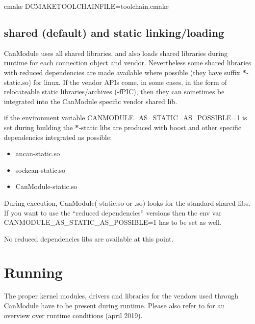 \documentclass[letterpaper,10pt,english]{sphinxmanual}
\begin{document}
\begin{sphinxVerbatim}[commandchars=\\\{\}]
cmake \PYGZhy{}DCMAKE\PYGZus{}TOOLCHAIN\PYGZus{}FILE=toolchain.cmake
\end{sphinxVerbatim}


\section{shared (default) and static linking/loading}
\label{\detokenize{building:shared-default-and-static-linking-loading}}
CanModule uses all shared libraries, and also loads shared libraries during runtime for each connection
object and vendor. Nevertheless some shared libraries with reduced dependencies are made available
where possible (they have suffix {\color{red}\bfseries{}*}-static.so) for linux.
If the vendor APIs come, in some cases, in the form of relocateable static libraries/archives (-fPIC), then they
can sometimes be integrated into the CanModule specific vendor shared lib.

if the environment variable CANMODULE\_AS\_STATIC\_AS\_POSSIBLE=1 is set during building the {\color{red}\bfseries{}*}-static
libs are produced with boost and other specific dependencies integrated as possible:
\begin{itemize}
\item {} 
ancan-static.so

\item {} 
sockcan-static.so

\item {} 
CanModule-static.so

\end{itemize}

During execution, CanModule(-static.so or .so) looks for the standard shared libs.
If you want to use the “reduced dependencies” versions then the env var CANMODULE\_AS\_STATIC\_AS\_POSSIBLE=1
has to be set  as well.


No reduced dependencies libs are available at this point.


\chapter{Running}
\label{\detokenize{running:running}}\label{\detokenize{running::doc}}
The proper kernel modules, drivers and libraries for the vendors used through CanModule
have to be present during runtime. Please also refer to  for an overview over
runtime conditions (april 2019).
\end{document}
